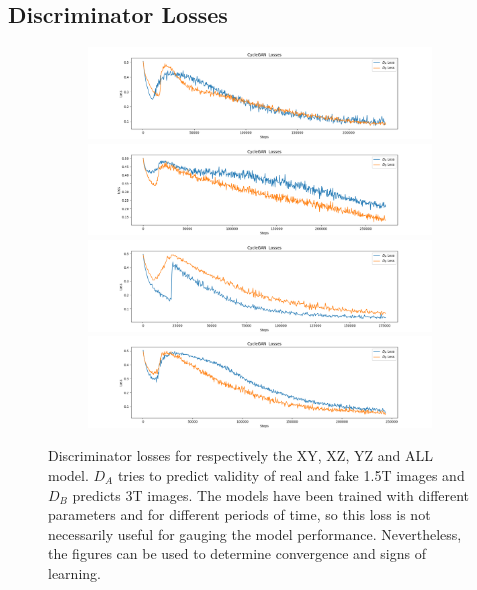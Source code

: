 \documentclass[12pt, fleqn, titlepage]{article}
\newcommand{\1}[1]{\mathds{1}\left[#1\right]}
\begin{document}
\subsection{Discriminator Losses}\label{disc_loss}
\begin{figure}[H]
	\centering
	\begin{subfigure}[b]{0.8\textwidth}
		\centering
		\includegraphics[width=\linewidth]{imgs/discriminator_losses/XY_model_discriminator_losses}
		\hfill
		\includegraphics[width=\linewidth]{imgs/discriminator_losses/XZ_model_discriminator_losses}
		\hfill
		\includegraphics[width=\linewidth]{imgs/discriminator_losses/YZ_model_discriminator_losses}
		\hfill
		\includegraphics[width=\linewidth]{imgs/discriminator_losses/ALL_model_discriminator_losses}
	\end{subfigure}
	\caption{Discriminator losses for respectively the XY, XZ, YZ and ALL model. $D_A$ tries to predict validity of real and fake 1.5T images and $D_B$ predicts 3T images. The models have been trained with different parameters and for different periods of time, so this loss is not necessarily useful for gauging the model performance. Nevertheless, the figures can be used to determine convergence and signs of learning.}
	\label{fig:discriminator_losses}
\end{figure}
\end{document}
